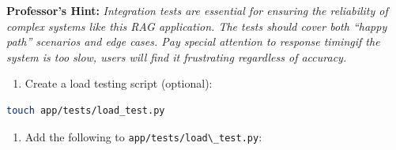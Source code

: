 \documentclass[
  screen,review,acmlarge]{acmart}
\newcommand{\passthrough}[1]{#1}
\providecommand{\tightlist}{%
  \setlength{\itemsep}{0pt}\setlength{\parskip}{0pt}}
\begin{document}
\textbf{Professor's Hint:} \emph{Integration tests are essential for ensuring the reliability of complex systems like this RAG application. The tests should cover both ``happy path'' scenarios and edge cases. Pay special attention to response timingif the system is too slow, users will find it frustrating regardless of accuracy.}

\begin{enumerate}
\def\labelenumi{\arabic{enumi}.}
\setcounter{enumi}{4}
\tightlist
\item
  Create a load testing script (optional):
\end{enumerate}

\begin{lstlisting}[language=bash]
touch app/tests/load_test.py
\end{lstlisting}

\begin{enumerate}
\def\labelenumi{\arabic{enumi}.}
\setcounter{enumi}{5}
\tightlist
\item
  Add the following to \passthrough{\lstinline!app/tests/load\_test.py!}:
\end{enumerate}
\end{document}
